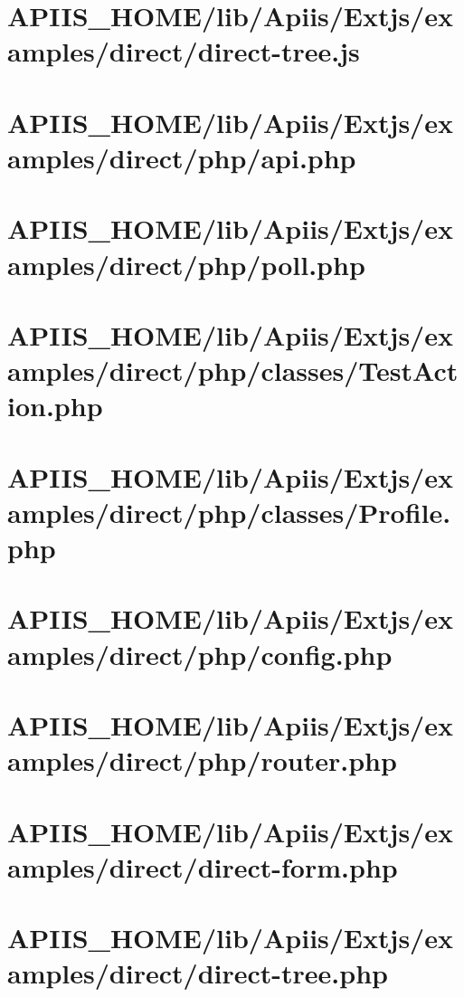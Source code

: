 \section{APIIS\_HOME/lib/Apiis/Extjs/examples/direct/direct-tree.js} 
\section{APIIS\_HOME/lib/Apiis/Extjs/examples/direct/php/api.php} 
\section{APIIS\_HOME/lib/Apiis/Extjs/examples/direct/php/poll.php} 
\section{APIIS\_HOME/lib/Apiis/Extjs/examples/direct/php/classes/TestAction.php} 
\section{APIIS\_HOME/lib/Apiis/Extjs/examples/direct/php/classes/Profile.php} 
\section{APIIS\_HOME/lib/Apiis/Extjs/examples/direct/php/config.php} 
\section{APIIS\_HOME/lib/Apiis/Extjs/examples/direct/php/router.php} 
\section{APIIS\_HOME/lib/Apiis/Extjs/examples/direct/direct-form.php} 
\section{APIIS\_HOME/lib/Apiis/Extjs/examples/direct/direct-tree.php} 
